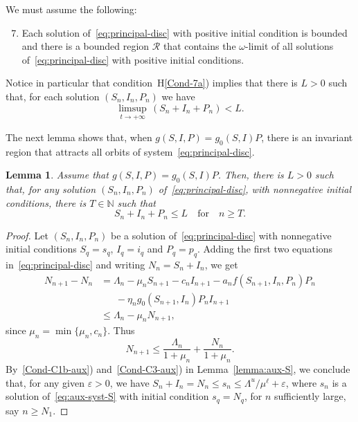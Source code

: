 \documentclass[reqno]{amsart}
\newtheorem{lemma}{Lemma}
\renewcommand{\le}{\leqslant}
\renewcommand{\ge}{\geqslant}
\newcommand{\eps}{\varepsilon}
\newcommand{\N}{\ensuremath{\mathds N}}
\begin{document}
{{We must assume the following:
\begin{enumerate}[H$1$)]
\setcounter{enumi}{6}
\item \label{Cond-7a} Each solution of~\eqref{eq:principal-disc} with positive initial condition is bounded and there is a bounded region $\mathcal R$ that contains the $\omega$-limit of all solutions of~\eqref{eq:principal-disc} with positive initial conditions.
\end{enumerate}
Notice in particular that condition~H\ref{Cond-7a}) implies that there is $L>0$ such that, for each solution $(S_n,I_n,P_n)$ we have
\begin{equation}\label{eq:bound}
\limsup_{t \to +\infty} \, (S_n+I_n+P_n) < L.
\end{equation}

The next lemma shows that, when $g(S,I,P)=g_0(S,I)P$, there is an invariant region that attracts all orbits of system~\eqref{eq:principal-disc}.
{\begin{lemma}\label{lemma:region}
Assume that $g(S,I,P)=g_0(S,I)P$. Then, there is $L>0$ such that, for any solution $(S_n,I_n,P_n)$ of~\eqref{eq:principal-disc},  with nonnegative initial conditions, there is $T \in \N$ such that
\[
S_n+I_n+P_n \le L \quad \text{for} \quad n \ge T.
\]
\end{lemma}}
\begin{proof}
Let $(S_n,I_n,P_n)$ be a solution of~\eqref{eq:principal-disc} with nonnegative initial conditions $S_q=s_q$, $I_q=i_q$ and $P_q=p_q$.
Adding the first two equations in~\eqref{eq:principal-disc} and writing $N_n=S_n+I_n$, we get
\[
\begin{split}
N_{n+1}-N_n
& =\Lambda_n-\mu_nS_{n+1}-c_nI_{n+1}-a_nf(S_{n+1},I_n,P_n)P_n\\
& \phantom{=} \ -\eta_ng_0(S_{n+1},I_n)P_nI_{n+1} \\
& \le \Lambda_n - \mu_nN_{n+1},
\end{split}
\]
since $\mu_n=\min\{\mu_n,c_n\}$. Thus
\[
N_{n+1} \le \dfrac{\Lambda_n}{1+\mu_n}+\dfrac{N_n}{1+\mu_n}.
\]
By~\ref{Cond-C1b-aux}) and~\ref{Cond-C3-aux}) in Lemma~\ref{lemma:aux-S}, we conclude that, for any given $\eps>0$, we have $S_n+I_n = N_n \le s_n \le \Lambda^u/\mu^\ell+\eps$, where $s_n$ is a solution of~\eqref{eq:aux-syst-S} with initial condition $s_q=N_q$, for $n$ sufficiently large, say  $n \ge N_1$.


\end{proof}}}
\end{document}
